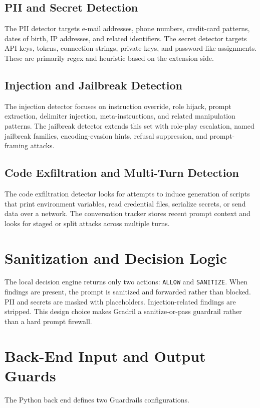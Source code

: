 \documentclass[journal]{IEEEtran}
\begin{document}
\subsection{PII and Secret Detection}
The PII detector targets e-mail addresses, phone numbers, credit-card patterns, dates of birth, IP addresses, and related identifiers. The secret detector targets API keys, tokens, connection strings, private keys, and password-like assignments. These are primarily regex and heuristic based on the extension side.

\subsection{Injection and Jailbreak Detection}
The injection detector focuses on instruction override, role hijack, prompt extraction, delimiter injection, meta-instructions, and related manipulation patterns. The jailbreak detector extends this set with role-play escalation, named jailbreak families, encoding-evasion hints, refusal suppression, and prompt-framing attacks.

\subsection{Code Exfiltration and Multi-Turn Detection}
The code exfiltration detector looks for attempts to induce generation of scripts that print environment variables, read credential files, serialize secrets, or send data over a network. The conversation tracker stores recent prompt context and looks for staged or split attacks across multiple turns.

\section{Sanitization and Decision Logic}
The local decision engine returns only two actions: \texttt{ALLOW} and \texttt{SANITIZE}. When findings are present, the prompt is sanitized and forwarded rather than blocked. PII and secrets are masked with placeholders. Injection-related findings are stripped. This design choice makes Gradril a sanitize-or-pass guardrail rather than a hard prompt firewall.

\section{Back-End Input and Output Guards}
The Python back end defines two Guardrails configurations.
\end{document}
